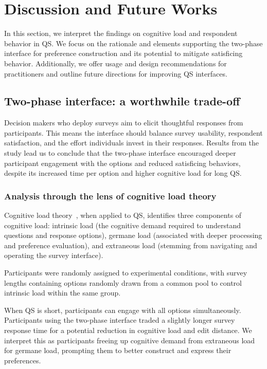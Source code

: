 \section{Discussion and Future Works}
\label{sec:discussion}

In this section, we interpret the findings on cognitive load and respondent behavior in QS. We focus on the rationale and elements supporting the two-phase interface for preference construction and its potential to mitigate satisficing behavior. Additionally, we offer usage and design recommendations for practitioners and outline future directions for improving QS interfaces.

\subsection{Two-phase interface: a worthwhile trade-off}
Decision makers who deploy surveys aim to elicit thoughtful responses from participants. This means the interface should balance survey usability, respondent satisfaction, and the effort individuals invest in their responses. Results from the study lead us to conclude that the two-phase interface encouraged deeper participant engagement with the options and reduced satisficing behaviors, despite its increased time per option and higher cognitive load for long QS.

\subsubsection{Analysis through the lens of cognitive load theory}
Cognitive load theory~\cite{swellerCognitiveLoadTheory2011}, when applied to QS, identifies three components of cognitive load: intrinsic load (the cognitive demand required to understand questions and response options), germane load (associated with deeper processing and preference evaluation), and extraneous load (stemming from navigating and operating the survey interface).

Participants were randomly assigned to experimental conditions, with survey lengths containing options randomly drawn from a common pool to control intrinsic load within the same group. 

When QS is short, participants can engage with all options simultaneously. Participants using the two-phase interface traded a slightly longer survey response time for a potential reduction in cognitive load and edit distance. We interpret this as participants freeing up cognitive demand from extraneous load for germane load, prompting them to better construct and express their preferences.


